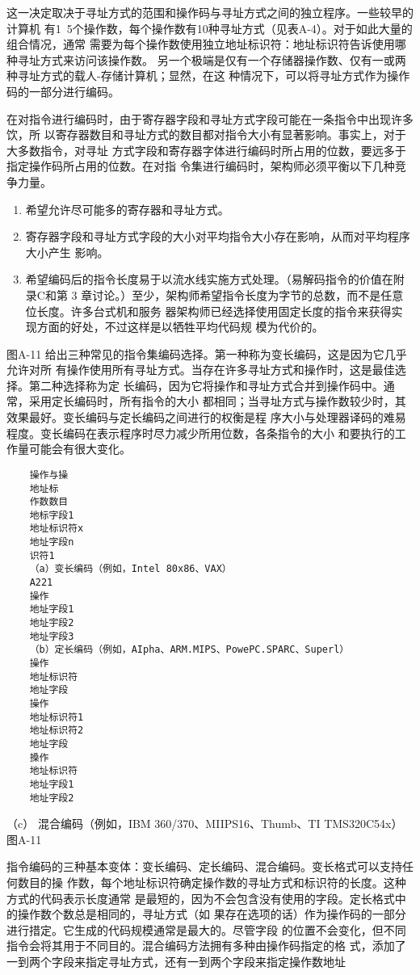 这一决定取决于寻址方式的范围和操作码与寻址方式之间的独立程序。一些较早的计算机
有1~5个操作数，每个操作数有10种寻址方式（见表A-4）。对于如此大量的组合情况，通常
需要为每个操作数使用独立地址标识符：地址标识符告诉使用哪种寻址方式来访问该操作数。
另一个极端是仅有一个存储器操作数、仅有一或两种寻址方式的载人-存储计算机；显然，在这
种情况下，可以将寻址方式作为操作码的一部分进行编码。

在对指令进行编码时，由于寄存器字段和寻址方式字段可能在一条指令中出现许多饮，所
以寄存器数目和寻址方式的数目都对指令大小有显著影响。事实上，对于大多数指令，对寻址
方式字段和寄存器字体进行编码时所占用的位数，要远多于指定操作码所占用的位数。在对指
令集进行编码时，架构师必须平衡以下几种竞争力量。

\begin{enumerate}
    \item 希望允许尽可能多的寄存器和寻址方式。
    \item 寄存器字段和寻址方式字段的大小对平均指令大小存在影响，从而对平均程序大小产生
    影响。
    \item 希望编码后的指令长度易于以流水线实施方式处理。（易解码指令的价值在附录C和第
    3 章讨论。）至少，架构师希望指令长度为字节的总数，而不是任意位长度。许多台式机和服务
    器架构师已经选择使用固定长度的指令来获得实现方面的好处，不过这样是以牺牲平均代码规
    模为代价的。
\end{enumerate}

图A-11 给出三种常见的指令集编码选择。第一种称为变长编码，这是因为它几乎允许对所
有操作使用所有寻址方式。当存在许多寻址方式和操作时，这是最佳选择。第二种选择称为定
长编码，因为它将操作和寻址方式合并到操作码中。通常，采用定长编码时，所有指令的大小
都相同；当寻址方式与操作数较少时，其效果最好。变长编码与定长编码之间进行的权衡是程
序大小与处理器译码的难易程度。变长编码在表示程序时尽力减少所用位数，各条指令的大小
和要执行的工作量可能会有很大变化。
\begin{verbatim}
    操作与操
    地址标
    作数数目
    地标字段1
    地址标识符x
    地址字段n
    识符1
    （a）变长编码（例如，Intel 80x86、VAX）
    A221
    操作
    地址字段1
    地址宇段2
    地址字段3
    （b）定长编码（例如，AIpha、ARM.MIPS、PowePC.SPARC、Superl）
    操作
    地址标识符
    地址字段
    操作
    地址标识符1
    地址标识符2
    地址字段
    搡作
    地址标识符
    地址字段1
    地址字段2
\end{verbatim}
（c） 混合编码（例如，IBM 360/370、MIIPS16、Thumb、TI TMS320C54x）
图A-11

指令编码的三种基本变体：变长编码、定长编码、混合编码。变长格式可以支持任何数目的操
作数，每个地址标识符确定操作数的寻址方式和标识符的长度。这种方式的代码表示长度通常
是最短的，因为不会包含没有使用的字段。定长格式中的操作数个数总是相同的，寻址方式（如
果存在选项的话）作为操作码的一部分进行措定。它生成的代码规模通常是最大的。尽管字段
的位置不会变化，但不同指令会将其用于不同目的。混合编码方法拥有多种由操作码指定的格
式，添加了一到两个字段来指定寻址方式，还有一到两个字段来指定操作数地址

